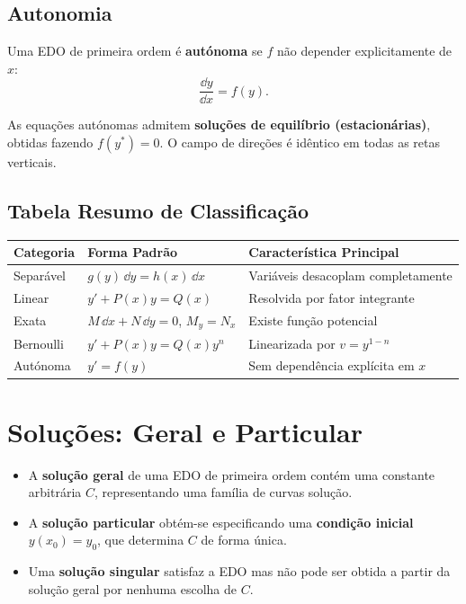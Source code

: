 \subsection{Autonomia}

\begin{defbox}[title={EDO Autónoma}]
  Uma EDO de primeira ordem é \textbf{autónoma} se $f$ não depender explicitamente de $x$:
  \[
    \frac{\dd y}{\dd x} = f(y).
  \]
\end{defbox}

As equações autónomas admitem \textbf{soluções de equilíbrio (estacionárias)}, obtidas
fazendo $f(y^{*})=0$. O campo de direções é idêntico em todas as retas verticais.

\subsection{Tabela Resumo de Classificação}

\begin{center}
\renewcommand{\arraystretch}{1.3}
\begin{tabularx}{0.92\linewidth}{X X X}
  \toprule
  \textbf{Categoria} & \textbf{Forma Padrão} & \textbf{Característica Principal} \\
  \midrule
  Separável    & $g(y)\,\dd y = h(x)\,\dd x$          & Variáveis desacoplam completamente \\
  Linear       & $y' + P(x)y = Q(x)$                  & Resolvida por fator integrante \\
  Exata        & $M\,\dd x + N\,\dd y = 0$, $M_y=N_x$ & Existe função potencial \\
  Bernoulli    & $y' + P(x)y = Q(x)y^n$               & Linearizada por $v=y^{1-n}$ \\
  Autónoma     & $y' = f(y)$                           & Sem dependência explícita em $x$ \\
  \bottomrule
\end{tabularx}
\end{center}

\section{Soluções: Geral e Particular}
\label{sec:solutions5}

\begin{defbox}[title={Soluções de uma EDO}]
  \begin{itemize}
    \item A \textbf{solução geral} de uma EDO de primeira ordem contém uma constante
          arbitrária $C$, representando uma família de curvas solução.
    \item A \textbf{solução particular} obtém-se especificando uma
          \textbf{condição inicial} $y(x_0) = y_0$, que determina $C$ de forma única.
    \item Uma \textbf{solução singular} satisfaz a EDO mas não pode ser obtida a partir
          da solução geral por nenhuma escolha de $C$.
  \end{itemize}
\end{defbox}

